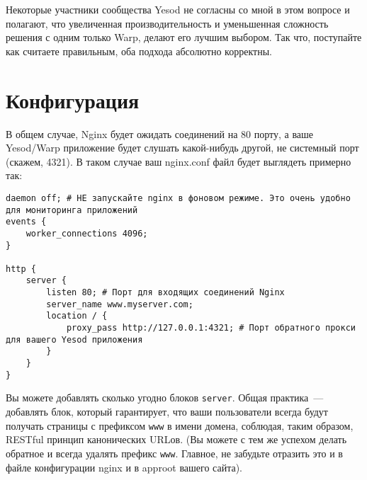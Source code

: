 Некоторые участники сообщества Yesod не согласны со мной в этом вопросе и полагают, что увеличенная производительность и уменьшенная сложность решения с одним только Warp, делают его лучшим выбором. Так что, поступайте как считаете правильным, оба подхода абсолютно корректны.

%
\section{Конфигурация}
%
%
В общем случае, Nginx будет ожидать соединений на 80 порту, а ваше Yesod/Warp приложение будет слушать какой-нибудь другой, не системный порт (скажем, 4321). В таком случае ваш nginx.conf файл будет выглядеть примерно так:

%
%
\begin{lstlisting}
daemon off; # НЕ запускайте nginx в фоновом режиме. Это очень удобно для мониторинга приложений
events {
    worker_connections 4096;
}

http {
    server {
        listen 80; # Порт для входящих соединений Nginx
        server_name www.myserver.com;
        location / {
            proxy_pass http://127.0.0.1:4321; # Порт обратного прокси для вашего Yesod приложения
        }
    }
}
\end{lstlisting}
%

Вы можете добавлять сколько угодно блоков \lstinline{server}. Общая практика~--- добавлять блок, который гарантирует, что ваши пользователи всегда будут получать страницы с префиксом \lstinline{www} в имени домена, соблюдая, таким образом, RESTful принцип канонических URLов. (Вы можете с тем же успехом делать обратное и всегда удалять префикс \lstinline{www}. Главное, не забудьте отразить это и в файле конфигурации nginx и в approot вашего сайта).

